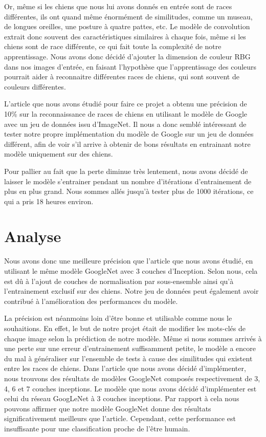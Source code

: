 \documentclass{article}
\begin{document}
Or, même si les chiens que nous lui avons donnés en entrée sont de races
différentes, ils ont quand même énormément de similitudes, comme un museau, de
longues oreilles, une posture à quatre pattes, etc. Le modèle de convolution
extrait donc souvent des caractéristiques similaires à chaque fois, même si les
chiens sont de race différente, ce qui fait toute la complexité de notre
apprentissage. Nous avons donc décidé d’ajouter la dimension de couleur RBG dans
nos images d’entrée, en faisant l'hypothèse que l’apprentissage des couleurs
pourrait aider à reconnaitre différentes races de chiens, qui sont souvent de
couleurs différentes. 

L’article que nous avons étudié pour faire ce projet a obtenu une précision de 10\%
sur la reconnaissance de races de chiens en utilisant le modèle de Google avec un
jeu de données issu d'ImageNet. Il nous a donc semblé intéressant de tester notre
propre implémentation du modèle de Google sur un jeu de données différent, afin de
voir s'il arrive à obtenir de bons résultats en entrainant notre modèle uniquement
sur des chiens.

Pour pallier au fait que la perte diminue très lentement, nous avons décidé de
laisser le modèle s’entrainer pendant un nombre d’itérations d’entrainement de
plus en plus grand. Nous sommes allés jusqu’à tester plus de 1000 itérations, ce
qui a pris 18 heures environ.


\section{Analyse}

Nous avons donc une meilleure précision que l’article que nous avons étudié,
en utilisant le même modèle GoogleNet avec 3 couches d'Inception. Selon nous, cela
est dû à l’ajout de couches de normalisation par sous-ensemble ainsi qu’à
l’entrainement exclusif sur des chiens. Notre jeu de données peut également avoir
contribué à l'amélioration des performances du modèle.

La précision est néanmoins loin d’être bonne et utilisable comme nous le
souhaitions. En effet, le but de notre projet était de modifier les mots-clés de
chaque image selon la prédiction de notre modèle. Même si nous sommes arrivés à
une perte sur une erreur d’entrainement suffisamment petite, le modèle a encore
du mal à généraliser sur l’ensemble de tests à cause des similitudes qui
existent entre les races de chiens. Dans l'article que nous avons décidé
d'implémenter, nous trouvons des résultats de modèles GoogleNet composés respectivement
de 3, 4, 6 et 7 couches inceptions. Le modèle que nous avons décidé d'implémenter
est celui du réseau GoogLeNet à 3 couches inceptions. Par rapport à cela nous
pouvons affirmer que notre modèle GoogleNet donne des résultats
significativement meilleurs que l'article. Cependant, cette performance est
insuffisante pour une classification proche de l'être humain.
\end{document}
